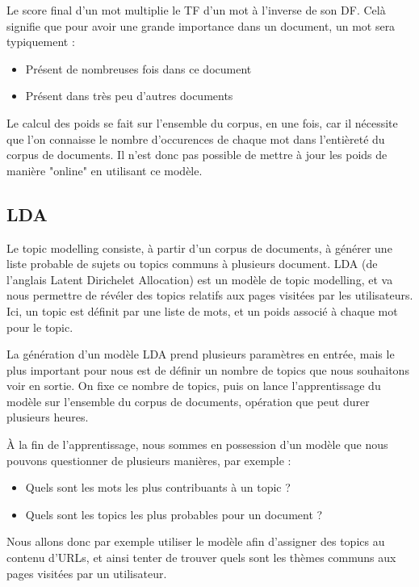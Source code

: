		Le score final d'un mot multiplie le TF d'un mot à l'inverse de son DF. Celà signifie que pour avoir une grande importance dans un document, un mot sera typiquement :
		\begin{itemize}
			\item Présent de nombreuses fois dans ce document
			\item Présent dans très peu d'autres documents
		\end{itemize}

		Le calcul des poids se fait sur l'ensemble du corpus, en une fois, car il nécessite que l'on connaisse le nombre d'occurences de chaque mot dans l'entièreté du corpus de documents. Il n'est donc pas possible de mettre à jour les poids de manière "online" en utilisant ce modèle.

	\subsection{LDA}\label{analyse-lda}

		Le topic modelling consiste, à partir d'un corpus de documents, à générer une liste probable de sujets ou topics communs à plusieurs document. LDA (de l'anglais Latent Dirichelet Allocation) est un modèle de topic modelling, et va nous permettre de révéler des topics relatifs aux pages visitées par les utilisateurs. Ici, un topic est définit par une liste de mots, et un poids associé à chaque mot pour le topic.

		La génération d'un modèle LDA prend plusieurs paramètres en entrée, mais le plus important pour nous est de définir un nombre de topics que nous souhaitons voir en sortie. On fixe ce nombre de topics, puis on lance l'apprentissage du modèle sur l'ensemble du corpus de documents, opération que peut durer plusieurs heures.

		À la fin de l'apprentissage, nous sommes en possession d'un modèle que nous pouvons questionner de plusieurs manières, par exemple :
		\begin{itemize}
			\item Quels sont les mots les plus contribuants à un topic ?
			\item Quels sont les topics les plus probables pour un document ?
		\end{itemize}

		Nous allons donc par exemple utiliser le modèle afin d'assigner des topics au contenu d'URLs, et ainsi tenter de trouver quels sont les thèmes communs aux pages visitées par un utilisateur.